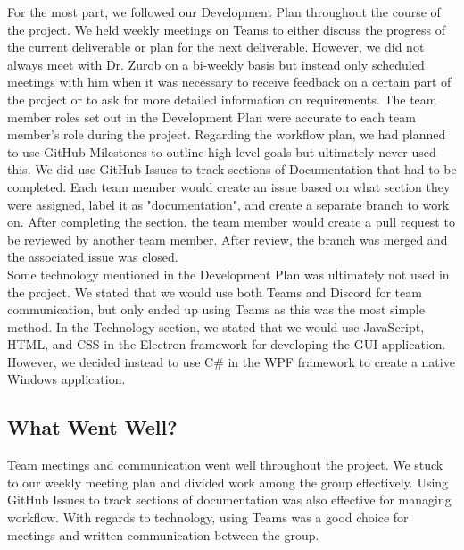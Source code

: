 \documentclass{article}
\begin{document}
\noindent For the most part, we followed our Development Plan throughout the course of the project. We held weekly meetings on Teams to either discuss the progress of the current deliverable or plan for the next deliverable. However, we did not always meet with Dr. Zurob on a bi-weekly basis but instead only scheduled meetings with him when it was necessary to receive feedback on a certain part of the project or to ask for more detailed information on requirements. The team member roles set out in the Development Plan were accurate to each team member's role during the project. Regarding the workflow plan, we had planned to use GitHub Milestones to outline high-level goals but ultimately never used this. We did use GitHub Issues to track sections of Documentation that had to be completed. Each team member would create an issue based on what section they were assigned, label it as "documentation", and create a separate branch to work on. After completing the section, the team member would create a pull request to be reviewed by another team member. After review, the branch was merged and the associated issue was closed. \\

\noindent Some technology mentioned in the Development Plan was ultimately not used in the project. We stated that we would use both Teams and Discord for team communication, but only ended up using Teams as this was the most simple method. In the Technology section, we stated that we would use JavaScript, HTML, and CSS in the Electron framework for developing the GUI application. However, we decided instead to use C# in the WPF framework to create a native Windows application. \\

\subsection{What Went Well?}


\noindent Team meetings and communication went well throughout the project. We stuck to our weekly meeting plan and divided work among the group effectively. Using GitHub Issues to track sections of documentation was also effective for managing workflow. With regards to technology, using Teams was a good choice for meetings and written communication between the group. \\
\end{document}

